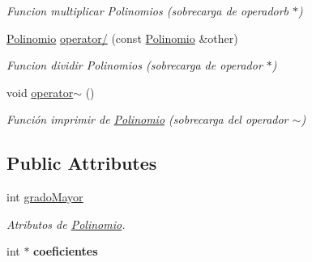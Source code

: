 \begin{DoxyCompactItemize}
\begin{DoxyCompactList}\small\item\em Funcion multiplicar Polinomios (sobrecarga de operadorb $\ast$) \end{DoxyCompactList}\item 
\hypertarget{class_polinomio_a7015af39ddcf8a94b6253ab469ff3761}{\hyperlink{class_polinomio}{Polinomio} \hyperlink{class_polinomio_a7015af39ddcf8a94b6253ab469ff3761}{operator/} (const \hyperlink{class_polinomio}{Polinomio} \&other)}\label{class_polinomio_a7015af39ddcf8a94b6253ab469ff3761}

\begin{DoxyCompactList}\small\item\em Funcion dividir Polinomios (sobrecarga de operador $\ast$) \end{DoxyCompactList}\item 
\hypertarget{class_polinomio_a3433445a715a473c4dd433e1d1248406}{void \hyperlink{class_polinomio_a3433445a715a473c4dd433e1d1248406}{operator$\sim$} ()}\label{class_polinomio_a3433445a715a473c4dd433e1d1248406}

\begin{DoxyCompactList}\small\item\em Función imprimir de \hyperlink{class_polinomio}{Polinomio} (sobrecarga del operador $\sim$) \end{DoxyCompactList}\end{DoxyCompactItemize}
\subsection*{Public Attributes}
\begin{DoxyCompactItemize}
\item 
\hypertarget{class_polinomio_a42b14d0901152a448b86808fd438382b}{int \hyperlink{class_polinomio_a42b14d0901152a448b86808fd438382b}{grado\+Mayor}}\label{class_polinomio_a42b14d0901152a448b86808fd438382b}

\begin{DoxyCompactList}\small\item\em Atributos de \hyperlink{class_polinomio}{Polinomio}. \end{DoxyCompactList}\item 
\hypertarget{class_polinomio_ae55bb8ffc2984a1a156ebc58380e1e71}{int $\ast$ {\bfseries coeficientes}}\label{class_polinomio_ae55bb8ffc2984a1a156ebc58380e1e71}

\end{DoxyCompactItemize}


